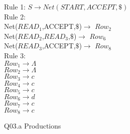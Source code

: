 \documentclass[12pt]{article}
\begin{document}
\begin{figure}
\begin{center}
\caption{Q03.a Productions}
Rule 1:
$S \rightarrow Net(START,ACCEPT,\$)$\\
Rule 2:\\
Net($READ_1$,ACCEPT,$\$$)$\rightarrow$ $Row_2$\\
Net($READ_2$,$READ_3$,$\$$)$\rightarrow$ $Row_6$\\
Net($READ_3$,ACCEPT,$\$$)$\rightarrow$ $Row_8$\\
Rule 3:\\
$Row_1 \rightarrow \Lambda$\\
$Row_2 \rightarrow \Lambda$\\
$Row_3 \rightarrow c$\\
$Row_4 \rightarrow c$\\
$Row_5 \rightarrow c$\\
$Row_6 \rightarrow d$\\
$Row_7 \rightarrow c$\\
$Row_8 \rightarrow c$\\
\end{center}
\end{figure}
\DeclareRobustCommand*\drawboxes[1]{%
\begin{tikzpicture}[
        start chain=going right,
        node distance=0pt
    ]
    \IfSubStr{#1}{c1}{\myblackbox{c}}{\mygraybox{c}}%
    \IfSubStr{#1}{c2}{\myblackbox{c}}{\mygraybox{c}}%
    \IfSubStr{#1}{c3}{\myblackbox{c}}{\mygraybox{c}}%
    \IfSubStr{#1}{d1}{\myblackbox{d}}{\mygraybox{d}}%
    \IfSubStr{#1}{d2}{\myblackbox{d}}{\mygraybox{d}}%
    \IfSubStr{#1}{d3}{\myblackbox{d}~}{\mygraybox{d}~}
\end{tikzpicture}
}
\end{document}
